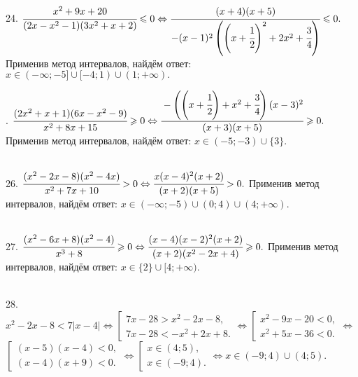 24. $\cfrac{x^2+9x+20}{(2x-x^2-1)(3x^2+x+2)}\leqslant0\Leftrightarrow \cfrac{(x+4)(x+5)}{-(x-1)^2\left(\left(x+\cfrac{1}{2}\right)^2+2x^2+\cfrac{3}{4}\right)}\leqslant0.$ Применив метод интервалов, найдём ответ: $x\in
(-\infty;-5]\cup[-4;1)\cup(1;+\infty).$
\begin{figure}[ht!]
\end{figure}\newpage{}. $\cfrac{(2x^2+x+1)(6x-x^2-9)}{x^2+8x+15}\geqslant0\Leftrightarrow \cfrac{-\left(\left(x+\cfrac{1}{2}\right)+x^2+\cfrac{3}{4}\right)(x-3)^2}{(x+3)(x+5)}\geqslant0.$ Применив метод интервалов, найдём ответ: $x\in
(-5;-3)\cup\{3\}.$
\begin{figure}[ht!]
\end{figure}\\
26. $\cfrac{(x^2-2x-8)(x^2-4x)}{x^2+7x+10}>0\Leftrightarrow\cfrac{x(x-4)^2(x+2)}{(x+2)(x+5)}>0.$ Применив метод интервалов, найдём ответ: $x\in
(-\infty;-5)\cup(0;4)\cup(4;+\infty).$
\begin{figure}[ht!]
\end{figure}\\
27. $\cfrac{(x^2-6x+8)(x^2-4)}{x^3+8}\geqslant0\Leftrightarrow \cfrac{(x-4)(x-2)^2(x+2)}{(x+2)(x^2-2x+4)}\geqslant0.$ Применив метод интервалов, найдём ответ: $x\in\{2\}\cup[4;+\infty).$
\begin{figure}[ht!]
\end{figure}\\
28. $x^2-2x-8<7|x-4|\Leftrightarrow \left[\begin{array}{l} 7x-28>x^2-2x-8,\\ 7x-28<-x^2+2x+8.\end{array}\right.\Leftrightarrow
\left[\begin{array}{l} x^2-9x-20<0,\\ x^2+5x-36<0.\end{array}\right.\Leftrightarrow$\\$
\left[\begin{array}{l} (x-5)(x-4)<0,\\ (x-4)(x+9)<0.\end{array}\right.\Leftrightarrow
\left[\begin{array}{l} x\in(4;5),\\ x\in(-9;4).\end{array}\right.\Leftrightarrow x\in (-9;4)\cup(4;5).$\\
